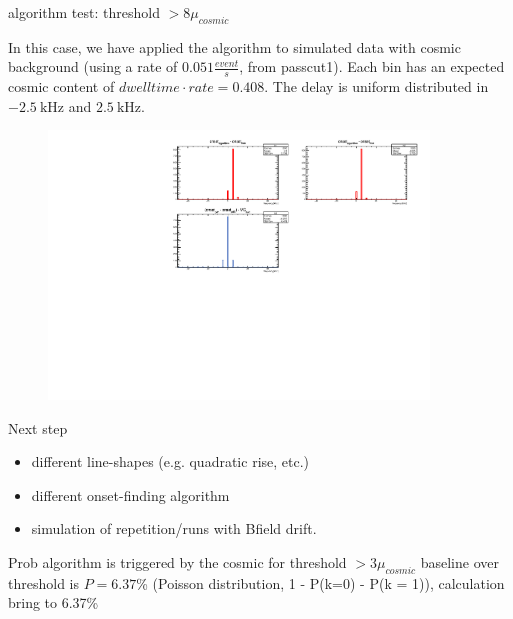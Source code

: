 \documentclass[9pt]{beamer}
\begin{document}
\begin{frame}{algorithm test: threshold $ > 8 \mu_{cosmic}$}

In this case, we have applied the algorithm to simulated data with cosmic background (using a rate of $0.051 \frac{event}{s}$, from passcut1). Each bin has an expected cosmic content of $dwelltime \cdot rate = 0.408$.
The delay is uniform distributed in $\SI{-2.5}{\kilo \hertz}$ and $\SI{+2.5}{\kilo \hertz}$. 
\begin{figure}
\includegraphics[width = 0.9\textwidth]{../Plot/OnsetResult15.pdf}
\end{figure}

\end{frame}

\begin{frame}{Next step}
\begin{itemize}
\item different line-shapes (e.g. quadratic rise, etc.)
\item different onset-finding algorithm
\item simulation of repetition/runs with Bfield drift.
\end{itemize}
\end{frame}

\begin{frame}

Prob algorithm is triggered by the cosmic for threshold $> 3 \mu_{cosmic}$ baseline over threshold is $P = 6.37$\% (Poisson distribution, 1 - P(k=0) - P(k = 1)), calculation bring to 6.37\% 

\end{frame}
\end{document}
